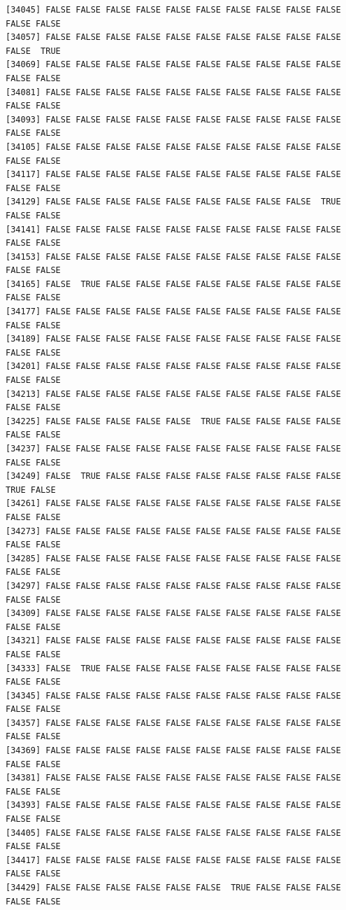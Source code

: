 \documentclass[
  a4paper,
  DIV=11,
  numbers=noendperiod]{scrartcl}
\begin{document}
\begin{verbatim}
[34045] FALSE FALSE FALSE FALSE FALSE FALSE FALSE FALSE FALSE FALSE FALSE FALSE
[34057] FALSE FALSE FALSE FALSE FALSE FALSE FALSE FALSE FALSE FALSE FALSE  TRUE
[34069] FALSE FALSE FALSE FALSE FALSE FALSE FALSE FALSE FALSE FALSE FALSE FALSE
[34081] FALSE FALSE FALSE FALSE FALSE FALSE FALSE FALSE FALSE FALSE FALSE FALSE
[34093] FALSE FALSE FALSE FALSE FALSE FALSE FALSE FALSE FALSE FALSE FALSE FALSE
[34105] FALSE FALSE FALSE FALSE FALSE FALSE FALSE FALSE FALSE FALSE FALSE FALSE
[34117] FALSE FALSE FALSE FALSE FALSE FALSE FALSE FALSE FALSE FALSE FALSE FALSE
[34129] FALSE FALSE FALSE FALSE FALSE FALSE FALSE FALSE FALSE  TRUE FALSE FALSE
[34141] FALSE FALSE FALSE FALSE FALSE FALSE FALSE FALSE FALSE FALSE FALSE FALSE
[34153] FALSE FALSE FALSE FALSE FALSE FALSE FALSE FALSE FALSE FALSE FALSE FALSE
[34165] FALSE  TRUE FALSE FALSE FALSE FALSE FALSE FALSE FALSE FALSE FALSE FALSE
[34177] FALSE FALSE FALSE FALSE FALSE FALSE FALSE FALSE FALSE FALSE FALSE FALSE
[34189] FALSE FALSE FALSE FALSE FALSE FALSE FALSE FALSE FALSE FALSE FALSE FALSE
[34201] FALSE FALSE FALSE FALSE FALSE FALSE FALSE FALSE FALSE FALSE FALSE FALSE
[34213] FALSE FALSE FALSE FALSE FALSE FALSE FALSE FALSE FALSE FALSE FALSE FALSE
[34225] FALSE FALSE FALSE FALSE FALSE  TRUE FALSE FALSE FALSE FALSE FALSE FALSE
[34237] FALSE FALSE FALSE FALSE FALSE FALSE FALSE FALSE FALSE FALSE FALSE FALSE
[34249] FALSE  TRUE FALSE FALSE FALSE FALSE FALSE FALSE FALSE FALSE  TRUE FALSE
[34261] FALSE FALSE FALSE FALSE FALSE FALSE FALSE FALSE FALSE FALSE FALSE FALSE
[34273] FALSE FALSE FALSE FALSE FALSE FALSE FALSE FALSE FALSE FALSE FALSE FALSE
[34285] FALSE FALSE FALSE FALSE FALSE FALSE FALSE FALSE FALSE FALSE FALSE FALSE
[34297] FALSE FALSE FALSE FALSE FALSE FALSE FALSE FALSE FALSE FALSE FALSE FALSE
[34309] FALSE FALSE FALSE FALSE FALSE FALSE FALSE FALSE FALSE FALSE FALSE FALSE
[34321] FALSE FALSE FALSE FALSE FALSE FALSE FALSE FALSE FALSE FALSE FALSE FALSE
[34333] FALSE  TRUE FALSE FALSE FALSE FALSE FALSE FALSE FALSE FALSE FALSE FALSE
[34345] FALSE FALSE FALSE FALSE FALSE FALSE FALSE FALSE FALSE FALSE FALSE FALSE
[34357] FALSE FALSE FALSE FALSE FALSE FALSE FALSE FALSE FALSE FALSE FALSE FALSE
[34369] FALSE FALSE FALSE FALSE FALSE FALSE FALSE FALSE FALSE FALSE FALSE FALSE
[34381] FALSE FALSE FALSE FALSE FALSE FALSE FALSE FALSE FALSE FALSE FALSE FALSE
[34393] FALSE FALSE FALSE FALSE FALSE FALSE FALSE FALSE FALSE FALSE FALSE FALSE
[34405] FALSE FALSE FALSE FALSE FALSE FALSE FALSE FALSE FALSE FALSE FALSE FALSE
[34417] FALSE FALSE FALSE FALSE FALSE FALSE FALSE FALSE FALSE FALSE FALSE FALSE
[34429] FALSE FALSE FALSE FALSE FALSE FALSE  TRUE FALSE FALSE FALSE FALSE FALSE

\end{verbatim}
\end{document}
